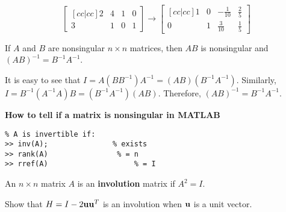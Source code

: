 \begin{enumerate}
\begin{example}
\[  \begin{bmatrix}[cc|cc]  2 & 4  &  1  &  0 \\ 3 & 1 &  0  &  1  \end{bmatrix}    \to \begin{bmatrix}[cc|cc]  1& 0  &  -\frac{1}{10}  &  \frac{2}{5} \\ 0 & 1 &  \frac{3}{10}  &  \frac{1}{5}  \end{bmatrix}  \] 
\end{example}

\vspace{0.2cm}
\begin{theorem}
	If $A$ and $B$ are nonsingular $n \times n$ matrices, then $AB$ is nonsingular and $(AB)^{-1} = B^{-1}A^{-1}$.
	
	\proof It is easy to see that $I = A(BB^{-1})A^{-1} = (AB)(B^{-1}A^{-1})$.  Similarly,  $I = B^{-1}(A^{-1}A)B =  (B^{-1}A^{-1})(AB)$.  Therefore, $(AB)^{-1} = B^{-1}A^{-1}$.  
\end{theorem}


\vspace{0.2cm}

\textbf{How to tell if a matrix is nonsingular in MATLAB}
 \begin{verbatim}
% A is invertible if: 
>> inv(A); 		         % exists
>> rank(A)		          % = n
>> rref(A)			          % = I 
\end{verbatim}
\vspace{0.2cm}




\begin{definition}
	An $n \times n$ matrix $A$ is an \textbf{involution} matrix if $A^2 = I$.
\end{definition}


\vspace{0.2cm}
\begin{example}
	Show that $H = I - 2 {\bf u}{\bf u}^T$ is an involution when ${\bf u}$ is a unit vector.  
	

\end{example}
\end{enumerate}
